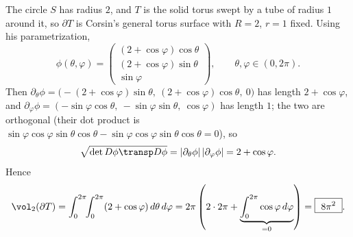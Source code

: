 \begin{exercisesolution}
The circle $S$ has radius $2$, and $T$ is the solid torus swept by a tube of radius $1$
around it, so $\partial T$ is Corsin's general torus surface with $R=2$, $r=1$ fixed. Using
his parametrization,
\[\phi(\theta,\varphi) = \begin{pmatrix}(2+\cos\varphi)\cos\theta\\
  (2+\cos\varphi)\sin\theta\\ \sin\varphi\end{pmatrix}, \qquad \theta,\varphi\in(0,2\pi).\]
Then $\partial_\theta\phi = \big(-(2+\cos\varphi)\sin\theta,\ (2+\cos\varphi)\cos\theta,\
0\big)$ has length $2+\cos\varphi$, and $\partial_\varphi\phi = (-\sin\varphi\cos\theta,\
-\sin\varphi\sin\theta,\ \cos\varphi)$ has length $1$; the two are orthogonal (their dot
product is $\sin\varphi\cos\varphi\sin\theta\cos\theta - \sin\varphi\cos\varphi\sin\theta
\cos\theta = 0$), so
\[\sqrt{\det D\phi\transp D\phi} = \lvert\partial_\theta\phi\rvert\,\lvert\partial_\varphi\phi
  \rvert = 2+\cos\varphi.\]
Hence
\[\vol_2(\partial T) = \int_0^{2\pi}\!\!\int_0^{2\pi} (2+\cos\varphi)\,d\theta\,d\varphi
  = 2\pi\left(2\cdot2\pi + \underbrace{\int_0^{2\pi}\cos\varphi\,d\varphi}_{=0}\right)
  = \boxed{\ 8\pi^2\ }.\]
\end{exercisesolution}

